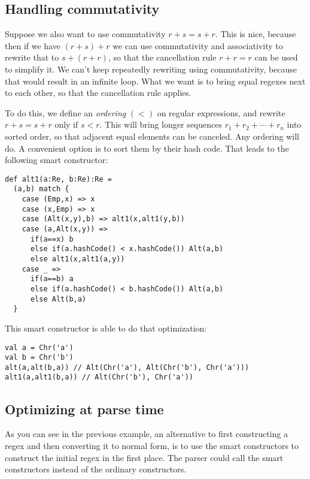\subsection{Handling commutativity}

Suppose we also want to use commutativity $r + s = s + r$. This is nice, because then if we have $(r + s) + r$ we can use commutativity and associativity to rewrite that to $s + (r + r)$, so that the cancellation rule $r + r = r$ can be used to simplify it. We can't keep repeatedly rewriting using commutativity, because that would result in an infinite loop. What we want is to bring equal regexes next to each other, so that the cancellation rule applies.

To do this, we define an \emph{ordering} $(<)$ on regular expressions, and rewrite $r + s = s + r$ only if $s < r$. This will bring longer sequences $r_1 + r_2 + \cdots + r_n$ into sorted order, so that adjacent equal elements can be canceled. Any ordering will do. A convenient option is to sort them by their hash code. That leads to the following smart constructor:

\begin{lstlisting}
def alt1(a:Re, b:Re):Re =
  (a,b) match {
    case (Emp,x) => x
    case (x,Emp) => x
    case (Alt(x,y),b) => alt1(x,alt1(y,b))
    case (a,Alt(x,y)) =>
      if(a==x) b
      else if(a.hashCode() < x.hashCode()) Alt(a,b)
      else alt1(x,alt1(a,y))
    case _ =>
      if(a==b) a
      else if(a.hashCode() < b.hashCode()) Alt(a,b)
      else Alt(b,a)
  }
\end{lstlisting}

This smart constructor is able to do that optimization:

\begin{lstlisting}
val a = Chr('a')
val b = Chr('b')
alt(a,alt(b,a)) // Alt(Chr('a'), Alt(Chr('b'), Chr('a')))
alt1(a,alt1(b,a)) // Alt(Chr('b'), Chr('a'))
\end{lstlisting}

\subsection{Optimizing at parse time}

As you can see in the previous example, an alternative to first constructing a regex and then converting it to normal form, is to use the smart constructors to construct the initial regex in the first place. The parser could call the smart constructors instead of the ordinary constructors.

